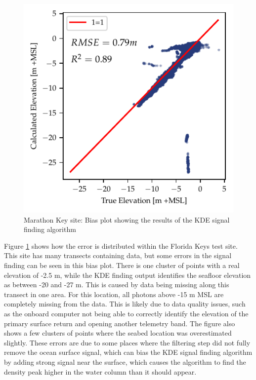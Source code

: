 \begin{figure}[!ht]
    \centering
    \includegraphics{figures/florida_keys_lidar_estimated_vs_truth.pdf}
    \caption{Marathon Key site: Bias plot showing the results of the KDE signal finding algorithm}
    \label{fig:keys-biasplot}
\end{figure}

Figure \ref{fig:keys-biasplot} shows how the error is distributed within the Florida Keys test site. This site has many transects containing data, but some errors in the signal finding can be seen in this bias plot. There is one cluster of points with a real elevation of -2.5 m, while the KDE finding output identifies the seafloor elevation as between -20 and -27 m. This is caused by data being missing along this transect in one area. For this location, all photons above -15 m MSL are completely missing from the data. This is likely due to data quality issues, such as the onboard computer not being able to correctly identify the elevation of the primary surface return and opening another telemetry band. The figure also shows a few clusters of points where the seabed location was overestimated slightly. These errors are due to some places where the filtering step did not fully remove the ocean surface signal, which can bias the KDE signal finding algorithm by adding strong signal near the surface, which causes the algorithm to find the density peak higher in the water column than it should appear.

